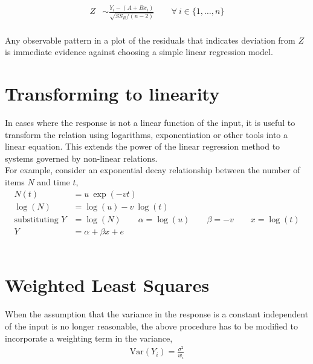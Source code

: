 \begin{align}
	Z &\sim \frac{Y_i - (A + B x_i)}{\sqrt{SS_R / (n-2)}} \qquad \forall\ i\in \{1,\dots, n\}
\end{align}\\

Any observable pattern in a plot of the residuals that indicates deviation from $ Z $ is immediate evidence against choosing a simple linear regression model.\\

\section{Transforming to linearity}

In cases where the response is not a linear function of the input, it is useful to transform the relation using logarithms, exponentiation or other tools into a linear equation. This extends the power of the linear regression method to systems governed by non-linear relations.\\

For example, consider an exponential decay relationship between the number of items $ N $ and time $ t $,\\

\begin{align}
	N(t) &= u\ \exp(-vt) \nonumber \\
	\log(N) &= \log(u) - v\ \log(t) \nonumber \\
	\text{substituting }Y &= \log(N) \qquad \alpha = \log(u) \qquad \beta = -v \qquad x = \log(t) \nonumber \\
	Y &= \alpha + \beta x + e \nonumber
\end{align}\\

\section{Weighted Least Squares}

When the assumption that the variance in the response is a constant independent of the input is no longer reasonable, the above procedure has to be modified to incorporate a weighting term in the variance,\\

\begin{align}
	\mathrm{Var}(Y_i) = \frac{\sigma^2}{w_i}
\end{align}\\

